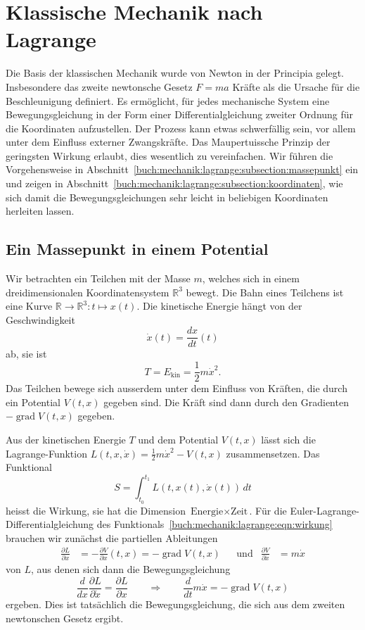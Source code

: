 %
%
%
\section{Klassische Mechanik nach Lagrange
\label{buch:mechanik:section:lagrange}}
Die Basis der klassischen Mechanik wurde von Newton in der
Principia gelegt.
Insbesondere das zweite newtonsche Gesetz
\(
F=ma
\)
Kräfte als die Ursache für die Beschleunigung definiert.
Es ermöglicht, für jedes mechanische System eine Bewegungsgleichung
in der Form einer Differentialgleichung zweiter Ordnung für die
Koordinaten aufzustellen.
Der Prozess kann etwas schwerfällig sein, vor allem unter dem Einfluss
externer Zwangskräfte.
Das Maupertuissche Prinzip der geringsten Wirkung erlaubt, dies wesentlich
zu vereinfachen.
Wir führen die Vorgehensweise in
Abschnitt~\ref{buch:mechanik:lagrange:subsection:massepunkt}
ein und zeigen in
Abschnitt~\ref{buch:mechanik:lagrange:subsection:koordinaten},
wie sich damit die Bewegungsgleichungen sehr leicht in beliebigen
Koordinaten herleiten lassen.


%
%
\subsection{Ein Massepunkt in einem Potential
\label{buch:mechanik:lagrange:subsection:massepunkt}}
Wir betrachten ein Teilchen mit der Masse $m$, welches sich in
einem dreidimensionalen Koordinatensystem $\mathbb{R}^3$ bewegt.
Die Bahn eines Teilchens ist eine Kurve
$\mathbb{R}\to\mathbb{R}^3:t\mapsto x(t)$.
Die kinetische Energie hängt von der Geschwindigkeit 
\[
\dot{x}(t) = \frac{dx}{dt}(t)
\]
ab, sie ist
\[
T=
E_{\text{kin}}
=
\frac12 m\dot{x}^2.
\]
Das Teilchen bewege sich ausserdem unter dem Einfluss von Kräften,
die durch ein Potential $V(t,x)$ gegeben sind.
Die Kräft sind dann durch den Gradienten $-\operatorname{grad}V(t,x)$ 
gegeben.

Aus der kinetischen Energie $T$ und dem Potential $V(t,x)$ lässt sich
die Lagrange-Funktion $L(t,x,\dot{x}) = \frac12m\dot{x}^2-V(t,x)$ 
zusammensetzen.
Das Funktional
\begin{equation}
S
=
\int_{t_0}^{t_1}
L(t,x(t),\dot{x}(t))
\,dt
\label{buch:mechanik:lagrange:eqn:wirkung}
\end{equation}
heisst die Wirkung, sie hat die Dimension $\text{Energie}\times\text{Zeit}$.
Für die Euler-Lagrange-Dif\-fe\-ren\-tialgleichung des
Funktionals~\eqref{buch:mechanik:lagrange:eqn:wirkung} brauchen wir
zunächst die partiellen Ableitungen
\begin{align*}
\frac{\partial L}{\partial x}
&=
-\frac{\partial V}{\partial x}(t,x)
=
-\operatorname{grad}V(t,x)
&&\text{und}&
\frac{\partial V}{\partial\dot{x}}
&=
m\dot{x}
\end{align*}
von $L$, aus denen sich dann die Bewegungsgleichung
\[
\frac{d}{dx}\frac{\partial L}{\partial\dot{x}}
=
\frac{\partial L}{\partial x}
\qquad\Rightarrow\qquad
\frac{d}{dt}m\dot{x}
=
-\operatorname{grad}V(t,x)
\]
ergeben. 
Dies ist tatsächlich die Bewegungsgleichung, die sich aus dem
zweiten newtonschen Gesetz ergibt.

